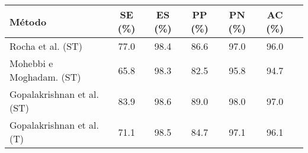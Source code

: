 \begin{tabular}{lcccccc}
    \toprule
    Método & SE (\%) & ES (\%) & PP (\%) & PN (\%) & AC (\%)\\
    \midrule
    Rocha et al. (ST)          & 77.0 & 98.4 & 86.6 & 97.0 & 96.0\\
    Mohebbi e Moghadam. (ST)   & 65.8 & 98.3 & 82.5 & 95.8 & 94.7\\
    \rowcolor[gray]{0.9}
    Gopalakrishnan et al. (ST) & 83.9 & 98.6 & 89.0 & 98.0 & 97.0\\
    Gopalakrishnan et al. (T)  & 71.1 & 98.5 & 84.7 & 97.1 & 96.1\\
    \bottomrule
\end{tabular}